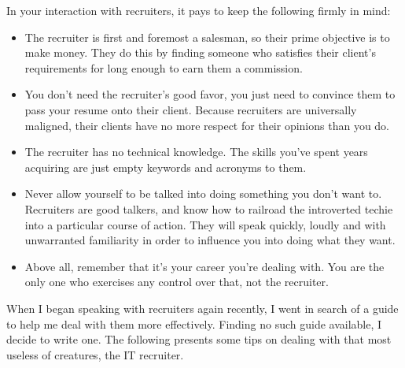 \documentclass{article}
\begin{document}
In your interaction with recruiters, it pays to keep the following
firmly in mind:

\begin{itemize}
\item The recruiter is first and foremost a salesman, so their prime
objective is to make money. They do this by finding someone who
satisfies their client's requirements for long enough to earn them a
commission.
\item You don't need the recruiter's good favor, you just need to convince
them to pass your resume onto their client. Because recruiters are
universally maligned, their clients have no more respect for their
opinions than you do.
\item The recruiter has no technical knowledge. The skills you've spent
years acquiring are just empty keywords and acronyms to them.
\item Never allow yourself to be talked into doing something you don't want
to. Recruiters are good talkers, and know how to railroad the
introverted techie into a particular course of action. They will
speak quickly, loudly and with unwarranted familiarity in order to
influence you into doing what they want.
\item Above all, remember that it's your career you're dealing with. You
are the only one who exercises any control over that, not the
recruiter.
\end{itemize}

When I began speaking with recruiters again recently, I went in search
of a guide to help me deal with them more effectively. Finding no such
guide available, I decide to write one. The following presents some tips
on dealing with that most useless of creatures, the IT recruiter.
\end{document}
